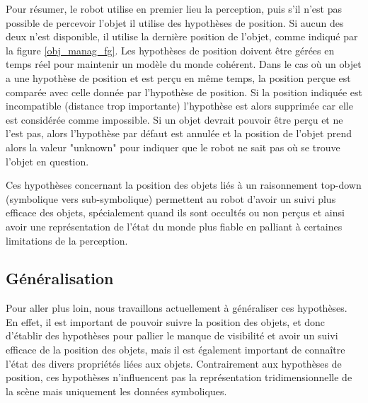 \documentclass[a4paper,11pt,twoside]{StyleThese}
\begin{document}
Pour résumer, le robot utilise en premier lieu la perception, puis s'il n'est pas possible de percevoir l'objet il utilise des hypothèses de position.
Si aucun des deux n'est disponible, il utilise la dernière position de l'objet, comme indiqué par la figure \ref{obj_manag_fg}.
Les hypothèses de position doivent être gérées en temps réel pour maintenir un modèle du monde cohérent.
Dans le cas où un objet a une hypothèse de position et est perçu en même temps, la position perçue est comparée avec celle donnée par l'hypothèse de position. Si la  position indiquée est incompatible (distance trop importante) l'hypothèse est alors supprimée car elle est considérée comme impossible.
Si un objet devrait pouvoir être perçu et ne l'est pas, alors l'hypothèse par défaut est annulée et la position de l'objet prend alors la valeur "unknown" pour indiquer que le robot ne sait pas où se trouve l'objet en question.

Ces hypothèses concernant la position des objets liés à un raisonnement top-down (symbolique vers sub-symbolique) permettent au robot d'avoir un suivi plus efficace des objets, spécialement quand ils sont occultés ou non perçus et ainsi avoir une représentation de l'état du monde plus fiable en palliant à certaines limitations de la perception.


\subsection{Généralisation}



Pour aller plus loin, nous travaillons actuellement à généraliser ces hypothèses. En effet, il est important de pouvoir suivre la position des objets, et donc d'établir des hypothèses pour pallier le manque de visibilité et avoir un suivi efficace de la position des objets, mais il est également important de connaître l'état des divers propriétés liées aux objets. Contrairement aux hypothèses de position, ces hypothèses n'influencent pas la représentation tridimensionnelle de la scène mais uniquement les données symboliques.
\end{document}
